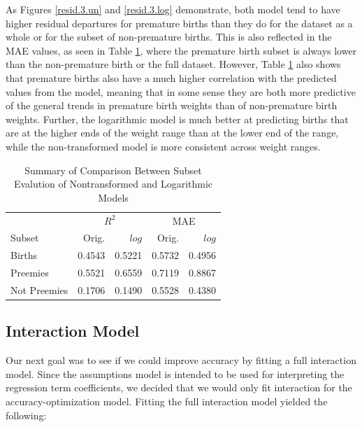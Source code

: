 \documentclass{article}\usepackage[]{graphicx}\usepackage[]{xcolor}
\begin{document}
As Figures \ref{resid.3.un} and \ref{resid.3.log} demonstrate, both model tend to have higher residual departures for premature births than they do for the dataset as a whole or for the subset of non-premature births. This is also reflected in the MAE values, as seen in Table \ref{subset.comp}, where the premature birth subset is always lower than the non-premature birth or the full dataset. However, Table \ref{subset.comp} also shows that premature births also have a much higher correlation with the predicted values from the model, meaning that in some sense they are both more predictive of the general trends in premature birth weights than of non-premature birth weights. Further, the logarithmic model is much better at predicting births that are at the higher ends of the weight range than at the lower end of the range, while the non-transformed model is more consistent across weight ranges. 

\begin{table}[H]
\centering
\begin{tabular}{lrrrr}
  \hline
  &  \multicolumn{2}{c}{$R^2$} & \multicolumn{2}{c}{MAE}\\
  Subset & Orig. & $log$ & Orig. & $log$\\ 
  \hline
   Births & 0.4543 & 0.5221 & 0.5732 & 0.4956 \\ 
   Preemies & 0.5521 &  0.6559 & 0.7119 &  0.8867 \\ 
   Not Preemies & 0.1706 & 0.1490 & 0.5528& 0.4380 \\
   \hline
\end{tabular}
\caption{Summary of Comparison Between Subset Evalution of Nontransformed and Logarithmic Models}
\label{subset.comp}
\end{table}

\subsection{Interaction Model}

Our next goal was to see if we could improve accuracy by fitting a full interaction model. Since the assumptions model is intended to be used for interpreting the regression term coefficients, we decided that we would only fit interaction for the accuracy-optimization model. Fitting the full interaction model yielded the following: 
\end{document}
